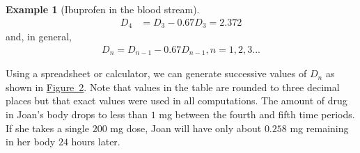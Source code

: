 \documentclass[10pt,]{book}
\theoremstyle{plain}
\theoremstyle{definition}
\theoremstyle{definition}
\newtheorem{example}[theorem]{Example}
\theoremstyle{definition}
\numberwithin{equation}{section}
\newlength{\panelmax}
\newcommand{\amp}{&}
\begin{document}
\begin{example}[Ibuprofen in the blood stream]
\begin{align*}
D_4 \amp = D_3-0.67D_3 = 2.372
\end{align*}
and, in general,%
\begin{gather*}
D_n=D_{n-1}-0.67D_{n-1},n=1,2,3...
\end{gather*}
%
\par
\hypertarget{p-11}{}%
Using a spreadsheet or calculator, we can generate successive values of \(D_n\) as shown in \hyperref[figure-ibuprofen-one-dose]{Figure~2}.  Note that values in the table are rounded to three decimal places but that exact values were used in all computations. The amount of drug in Joan's body drops to less than \(1\) mg between the fourth and fifth time periods.  If she takes a single \(200\) mg dose, Joan will have only about \(0.258\) mg remaining in her body \(24\) hours later.%
\begin{figure}
\centering
{%
\setlength{\panelmax}{0pt}
\ifdefined\panelboxAimage\else\newsavebox{\panelboxAimage}\fi%
\begin{lrbox}{\panelboxAimage}
\end{lrbox}
\ifdefined\phAimage\else\newlength{\phAimage}\fi%
\setlength{\phAimage}{\ht\panelboxAimage+\dp\panelboxAimage}
\settototalheight{\phAimage}{\usebox{\panelboxAimage}}
\setlength{\panelmax}{\maxof{\panelmax}{\phAimage}}
\ifdefined\panelboxBimage\else\newsavebox{\panelboxBimage}\fi%
\begin{lrbox}{\panelboxBimage}
\end{lrbox}
}
\end{figure}
\end{example}
\end{document}
